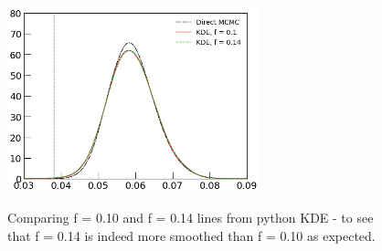\documentclass[prd,amsmath,amssymb,floatfix,superscriptaddress,nofootinbib]{revtex4-1}
\begin{document}
\begin{figure}
\includegraphics[width=0.65\textwidth]{cosmomc_kde/getdist_smoothing_test/pl18_pc_zmax30_pliklite_srollv2_1015_tau_posterior_python_kde_f_0p1_vs_0p14.png}
\label{fig:}
\caption{Comparing f = 0.10 and f = 0.14 lines from python KDE - to see that f = 0.14 is indeed more smoothed than f = 0.10 as expected.
} 
\end{figure}
\end{document}
